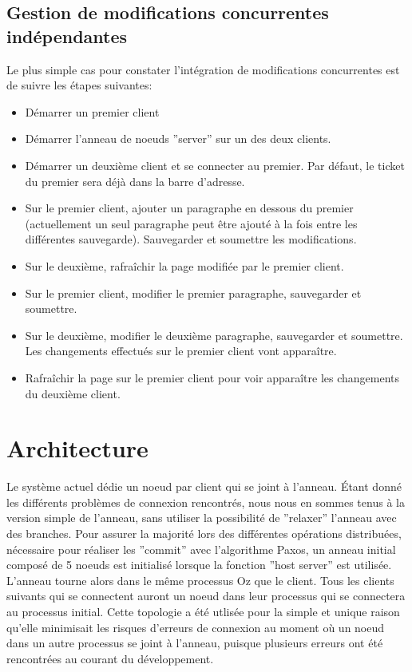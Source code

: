 \documentclass{article}
\begin{document}
	\subsection{Gestion de modifications concurrentes indépendantes}
	Le plus simple cas pour constater l'intégration de modifications concurrentes est de suivre les étapes suivantes:
	\begin{itemize}
		\item Démarrer un premier client
		\item Démarrer l'anneau de noeuds ''server'' sur un des deux clients.
		\item Démarrer un deuxième client et se connecter au premier.  Par défaut, le ticket
			du premier sera déjà dans la barre d'adresse.
		\item Sur le premier client, ajouter un paragraphe en dessous du premier (actuellement un 
			seul paragraphe peut être ajouté à la fois entre les différentes sauvegarde).
			Sauvegarder et soumettre les modifications.
		\item Sur le deuxième, rafraîchir la page modifiée par le premier client.
		\item Sur le premier client, modifier le premier paragraphe, sauvegarder et soumettre.
		\item Sur le deuxième, modifier le deuxième paragraphe, sauvegarder et soumettre. Les 
			changements effectués sur le premier client vont apparaître.
		\item Rafraîchir la page sur le premier client pour voir apparaître les changements du 
			deuxième client.	
	\end{itemize}
	
	\section{Architecture}
	Le système actuel dédie un noeud par client qui se joint à l'anneau.  Étant donné les différents 
	problèmes de connexion rencontrés, nous nous en sommes tenus à la version simple de l'anneau, 
	sans utiliser la possibilité de ''relaxer'' l'anneau avec des branches.  Pour assurer la majorité lors des
	différentes opérations distribuées, nécessaire pour réaliser les ''commit'' avec l'algorithme Paxos,
	un anneau initial composé de 5 noeuds est initialisé lorsque la fonction ''host server'' est utilisée.
	L'anneau tourne alors dans le même processus Oz que le client.  Tous les clients suivants qui
	se connectent auront un noeud dans leur processus qui se connectera au processus initial.  Cette topologie
	a été utlisée pour la simple et unique raison qu'elle minimisait les risques d'erreurs de connexion au moment 
	où un noeud dans un autre processus se joint à l'anneau, puisque plusieurs erreurs ont été 
	rencontrées au courant du développement.
	
\end{document}
